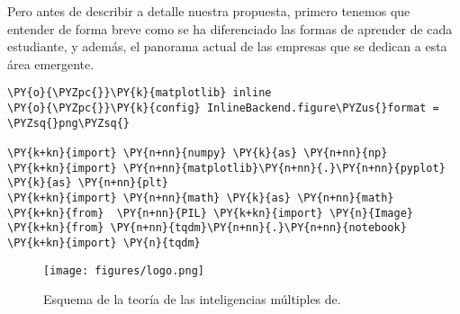 \documentclass[11pt,a4paper]{markdown}
\begin{document}
\quad Pero antes de describir a detalle nuestra propuesta, primero tenemos que entender de forma breve como se ha diferenciado las formas de aprender de cada estudiante, y además, el panorama actual de las empresas que se dedican a esta área emergente.

\begin{tcolorbox}[breakable, size=fbox, boxrule=1pt, pad at break*=1mm,colback=cellbackground, colframe=cellborder]
\begin{Verbatim}[commandchars=\\\{\}, fontsize=\scriptsize]
\PY{o}{\PYZpc{}}\PY{k}{matplotlib} inline
\PY{o}{\PYZpc{}}\PY{k}{config} InlineBackend.figure\PYZus{}format = \PYZsq{}png\PYZsq{}

\PY{k+kn}{import} \PY{n+nn}{numpy} \PY{k}{as} \PY{n+nn}{np}
\PY{k+kn}{import} \PY{n+nn}{matplotlib}\PY{n+nn}{.}\PY{n+nn}{pyplot} \PY{k}{as} \PY{n+nn}{plt}
\PY{k+kn}{import} \PY{n+nn}{math} \PY{k}{as} \PY{n+nn}{math}
\PY{k+kn}{from}  \PY{n+nn}{PIL} \PY{k+kn}{import} \PY{n}{Image}
\PY{k+kn}{from} \PY{n+nn}{tqdm}\PY{n+nn}{.}\PY{n+nn}{notebook} \PY{k+kn}{import} \PY{n}{tqdm}
\end{Verbatim}
\end{tcolorbox}

\begin{figure*}
\centering
\texttt{[image: figures/logo.png]}
\decoRule
\caption[Inteligencias múltiples de Gadner]{Esquema de la teoría de las inteligencias múltiples de. }
\label{fig:8-inteligencias-multiples}
\end{figure*}


\printbibliography
\end{document}
